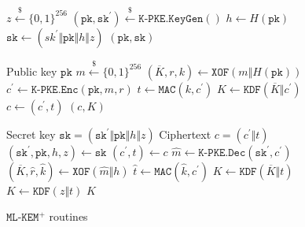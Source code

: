 \documentclass[journal=tches,submission]{iacrtrans}
\newcommand{\keygen}{\texttt{KeyGen}}
\newcommand{\encrypt}{\texttt{Enc}}
\newcommand{\decrypt}{\texttt{Dec}}
\newcommand{\encap}{\texttt{Encap}}
\newcommand{\decap}{\texttt{Decap}}
\newcommand{\mac}{\texttt{MAC}}
\newcommand{\pk}{\texttt{pk}}
\newcommand{\sk}{\texttt{sk}}
\newcommand{\leftsample}{\stackrel{\$}{\leftarrow}}
\begin{document}
\begin{figure}[H]
    \centering

    \begin{minipage}[t]{0.5\textwidth}
        \begin{algorithm}[H]
            \caption*{$\texttt{ML-KEM}^\texttt{+}\texttt{.}\keygen\texttt{()}$}
            \begin{algorithmic}[1]
                \State $z \leftsample \{0,1\}^{256}$
                \State $(\pk, \sk^\prime) \leftsample \texttt{K-PKE}.\keygen()$
                \State $h \leftarrow H(\pk)$
                \State $\sk \leftarrow (sk^\prime \Vert \pk \Vert h \Vert z)$
                \State \Return $(\pk, \sk)$
            \end{algorithmic}
        \end{algorithm}\vspace{-0.5cm}
        \begin{algorithm}[H]
            \caption*{$\texttt{ML-KEM}^\texttt{+}\texttt{.}\encap\texttt{(\pk)}$}
            \begin{algorithmic}[1]
                \Require Public key $\pk$
                \State $m \leftsample \{0,1\}^{256}$
                \State $(\overline{K}, r, k) \leftarrow \texttt{XOF}(m \Vert H(\pk))$
                \State $c^\prime \leftarrow \texttt{K-PKE}.\encrypt(\pk, m, r)$
                \State $t \leftarrow \mac(k, c^\prime)$
                \State $K \leftarrow \texttt{KDF}(\overline{K} \Vert c^\prime)$
                \State $c \leftarrow (c^\prime, t)$
                \State \Return $(c, K)$
            \end{algorithmic}
        \end{algorithm}
    \end{minipage}\hfill
    \begin{minipage}[t]{0.49\textwidth}
        \begin{algorithm}[H]
            \caption*{$\texttt{ML-KEM}^\texttt{+}\texttt{.}\decap\texttt{(\sk, c)}$}
            \begin{algorithmic}[1]
                \Require Secret key $\sk = (\sk^\prime \Vert \pk \Vert h \Vert z)$
                \Require Ciphertext $c = (c^\prime \Vert t)$
                \State $(\sk^\prime, \pk, h, z) \leftarrow \sk$
                \State $(c^\prime, t) \leftarrow c$
                \State $\hat{m} \leftarrow \texttt{K-PKE}.\decrypt(\sk^\prime, c^\prime)$
                \State $(\overline{K}, \hat{r}, \hat{k}) \leftarrow \texttt{XOF}(\hat{m} \Vert h)$
                \State $\hat{t} \leftarrow \mac(\hat{k}, c^\prime)$
                    \State $K \leftarrow \texttt{KDF}(\overline{K} \Vert t)$
                \Else
                    \State $K \leftarrow \texttt{KDF}(z \Vert t)$
                \EndIf
                \State \Return $K$
            \end{algorithmic}
        \end{algorithm}
    \end{minipage}

    \caption{$\texttt{ML-KEM}^+$ routines}\label{fig:ml-kem-plus-routines}
\end{figure}
\end{document}
